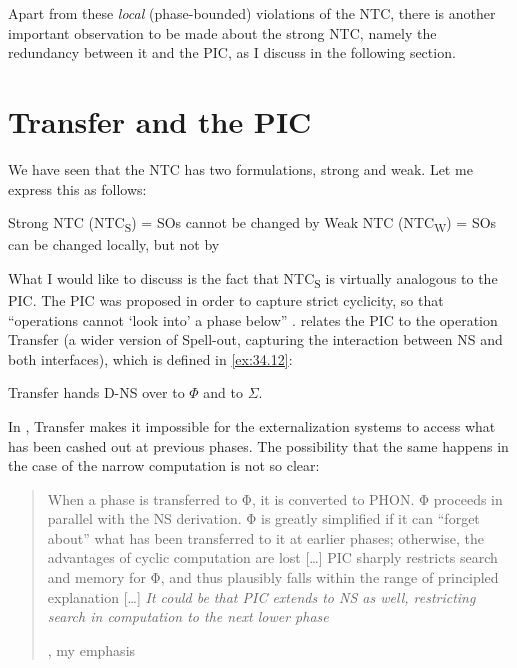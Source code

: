 \documentclass[output=paper]{langsci/langscibook}
\begin{document}
Apart from these \emph{local} (phase-bounded) violations of the \gls{NTC},
there is another important observation to be made about the strong \gls{NTC},
namely the redundancy between it and the \gls{PIC}, as I discuss in the
following section.

\section{Transfer and the PIC}\label{sec:34.3}

We have seen that the \gls{NTC} has two formulations, strong and weak. Let me
express this as follows:

\ea%
    \label{ex:34.11}
    \ea Strong \gls{NTC} (NTC\textsubscript{S}) = \glspl{SO} cannot be changed
    by 
    \ex Weak \gls{NTC} (NTC\textsubscript{W}) = \glspl{SO} can be changed
    locally, but not by 
	\z
\z

What I would like to discuss is the fact that NTC\textsubscript{S} is virtually
analogous to the \gls{PIC}. The \gls{PIC} was proposed in order to capture
strict cyclicity, so that \enquote{operations cannot ‘look into’ a phase below}
\citep[108]{Chomsky2000}. \citet{Chomsky2004} relates the \gls{PIC} to the
operation Transfer (a wider version of Spell-out, capturing the interaction
between \gls{NS} and both interfaces), which is defined in \eqref{ex:34.12}:

\ea%
    \label{ex:34.12}
         Transfer hands D-\gls{NS} over to ${\Phi}$ and to ${\Sigma}$.
         \parencite[107]{Chomsky2004}
\z

In \citet{Chomsky2004}, Transfer makes it impossible for the externalization
systems to access what has been cashed out at previous phases. The possibility
that the same happens in the case of the narrow computation is not so clear:

\blockquote[{\citealt[107]{Chomsky2004}, my emphasis}][.]{When a phase is
    transferred to Φ, it is converted to PHON. Φ proceeds in parallel with the
    \gls{NS} derivation. Φ is greatly simplified if it can “forget about” what has
    been transferred to it at earlier phases; otherwise, the advantages of
    cyclic computation are lost [\dots{}] \gls{PIC} sharply restricts search
    and memory for Φ, and thus plausibly falls within the range of principled
    explanation [\dots{}] \emph{It could be that \gls{PIC} extends to \gls{NS} as
well, restricting search in computation to the next lower phase}}
\end{document}
